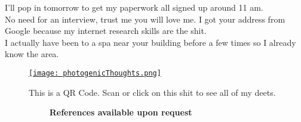 \documentclass[8pt]{article}
\renewcommand{\section}[2]%
        {\pagebreak[2]\vspace{1.\baselineskip}%
         \phantomsection\addcontentsline{toc}{section}{#1}%
         \hspace{0in}%
         \marginpar{
         \raggedright \scshape #1}#2}
\newcommand{\blankline}{\quad\pagebreak[2]}
\begin{document}
{I'll pop in tomorrow to get my paperwork all signed up around 11 am.\\ No need for an interview, trust me you will love me. I got your address from Google because my internet research skills are the shit.\\ I actually have been to a spa near your building before a few times so I already know the area.} 
  \begin{figure}
    \href{http://photogenicthoughts.wordpress.com/}
         {\texttt{[image: photogenicThoughts.png]}}
    \caption{This is a QR Code. Scan or click on this shit to see all of my deets.}
  \end{figure}

\textbf{\,\,\,\,\,\,\,\,\,\,\,\,\,\,\,\,\,\,\,\,\,\,\,\,\,\,\,\,\,\,\,\,References available upon request}






\end{document}
